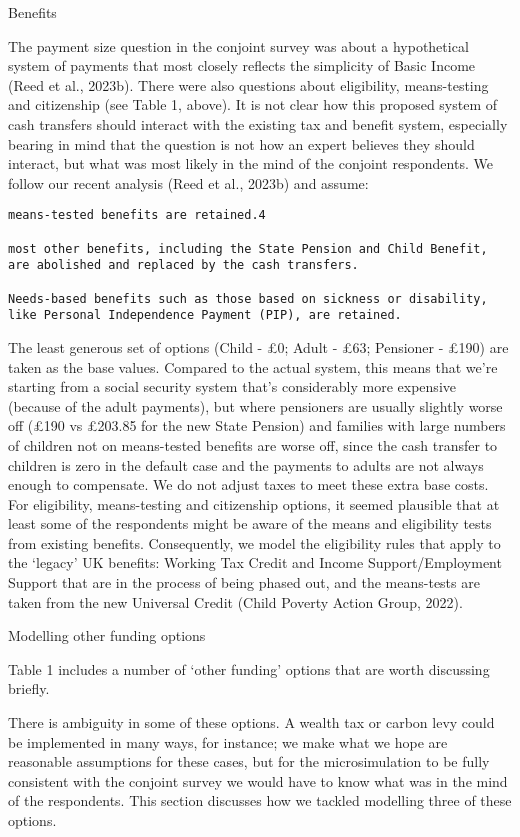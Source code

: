 \documentclass[
  letterpaper,
  DIV=11,
  numbers=noendperiod]{scrartcl}
\begin{document}
Benefits

The payment size question in the conjoint survey was about a
hypothetical system of payments that most closely reflects the
simplicity of Basic Income (Reed et al., 2023b). There were also
questions about eligibility, means-testing and citizenship (see Table 1,
above). It is not clear how this proposed system of cash transfers
should interact with the existing tax and benefit system, especially
bearing in mind that the question is not how an expert believes they
should interact, but what was most likely in the mind of the conjoint
respondents. We follow our recent analysis (Reed et al., 2023b) and
assume:

\begin{verbatim}
means-tested benefits are retained.4 

most other benefits, including the State Pension and Child Benefit, are abolished and replaced by the cash transfers. 

Needs-based benefits such as those based on sickness or disability, like Personal Independence Payment (PIP), are retained. 
\end{verbatim}

The least generous set of options (Child - £0; Adult - £63; Pensioner -
£190) are taken as the base values. Compared to the actual system, this
means that we're starting from a social security system that's
considerably more expensive (because of the adult payments), but where
pensioners are usually slightly worse off (£190 vs £203.85 for the new
State Pension) and families with large numbers of children not on
means-tested benefits are worse off, since the cash transfer to children
is zero in the default case and the payments to adults are not always
enough to compensate. We do not adjust taxes to meet these extra base
costs. For eligibility, means-testing and citizenship options, it seemed
plausible that at least some of the respondents might be aware of the
means and eligibility tests from existing benefits. Consequently, we
model the eligibility rules that apply to the `legacy' UK benefits:
Working Tax Credit and Income Support/Employment Support that are in the
process of being phased out, and the means-tests are taken from the new
Universal Credit (Child Poverty Action Group, 2022).

Modelling other funding options

Table 1 includes a number of `other funding' options that are worth
discussing briefly.

There is ambiguity in some of these options. A wealth tax or carbon levy
could be implemented in many ways, for instance; we make what we hope
are reasonable assumptions for these cases, but for the microsimulation
to be fully consistent with the conjoint survey we would have to know
what was in the mind of the respondents. This section discusses how we
tackled modelling three of these options.
\end{document}
